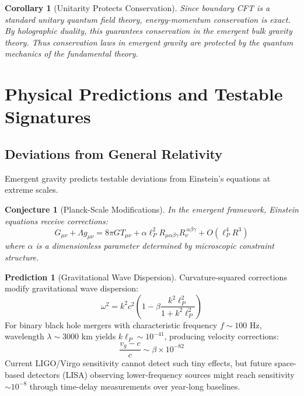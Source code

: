 \documentclass[11pt,a4paper]{article}
\newtheorem{corollary}[theorem]{Corollary}
\newtheorem{conjecture}{Conjecture}[section]
\theoremstyle{remark}
\theoremstyle{definition}
\newtheorem{prediction}{Prediction}[section]
\begin{document}
\begin{corollary}[Unitarity Protects Conservation]
Since boundary CFT is a standard unitary quantum field theory, energy-momentum conservation is exact. By holographic duality, this guarantees conservation in the emergent bulk gravity theory. Thus conservation laws in emergent gravity are protected by the quantum mechanics of the fundamental theory.
\end{corollary}

\section{Physical Predictions and Testable Signatures}
\label{sec:physical_predictions}

\subsection{Deviations from General Relativity}

Emergent gravity predicts testable deviations from Einstein's equations at extreme scales.

\begin{conjecture}[Planck-Scale Modifications]
In the emergent framework, Einstein equations receive corrections:
\begin{equation}
G_{\mu\nu} + \Lambda g_{\mu\nu} = 8\pi G T_{\mu\nu} + \alpha \ell_P^2 R_{\mu\alpha\beta\gamma} R_\nu^{~\alpha\beta\gamma} + O(\ell_P^4 R^3)
\end{equation}
where $\alpha$ is a dimensionless parameter determined by microscopic constraint structure.
\end{conjecture}

\begin{prediction}[Gravitational Wave Dispersion]
Curvature-squared corrections modify gravitational wave dispersion:
\begin{equation}
\omega^2 = k^2 c^2\left(1 - \beta \frac{k^2 \ell_P^2}{1 + k^2 \ell_P^2}\right)
\end{equation}
For binary black hole mergers with characteristic frequency $f \sim 100$ Hz, wavelength $\lambda \sim 3000$ km yields $k \ell_P \sim 10^{-41}$, producing velocity corrections:
\begin{equation}
\frac{v_g - c}{c} \sim \beta \times 10^{-82}
\end{equation}
Current LIGO/Virgo sensitivity cannot detect such tiny effects, but future space-based detectors (LISA) observing lower-frequency sources might reach sensitivity $\sim 10^{-8}$ through time-delay measurements over year-long baselines.
\end{prediction}
\end{document}
